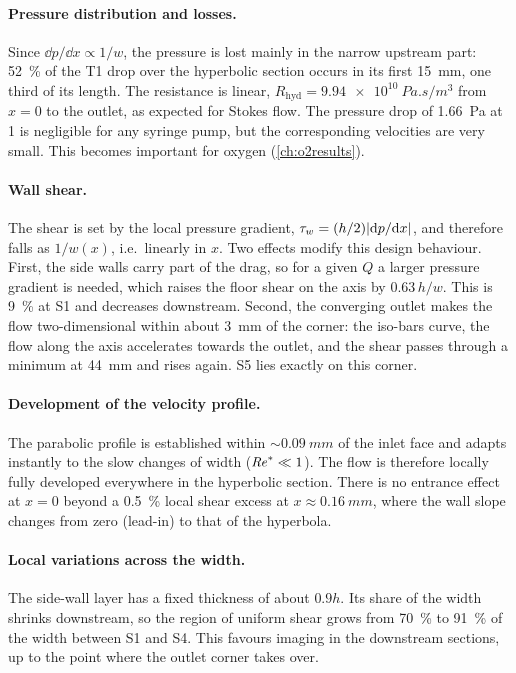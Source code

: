 \paragraph{Pressure distribution and losses.} Since $\dd p/\dd x\propto1/w$, the pressure is lost mainly in the narrow upstream part: \SI{52}{\percent} of the T1 drop over the hyperbolic section occurs in its first \SI{15}{mm}, one third of its length. The resistance is linear, $R_{\mathrm{hyd}}=\SI{9.94e10}{Pa.s/m^3}$ from $x=0$ to the outlet, as expected for Stokes flow. The pressure drop of \SI{1.66}{Pa} at \SI{1}{\uLmin} is negligible for any syringe pump, but the corresponding velocities are very small. This becomes important for oxygen (\cref{ch:o2results}).

\paragraph{Wall shear.} The shear is set by the local pressure gradient, $\tau_{w}=(h/2)|\mathrm{d} p/\mathrm{d} x|$, and therefore falls as $1/w(x)$, i.e.\ linearly in $x$. Two effects modify this design behaviour. First, the side walls carry part of the drag, so for a given $Q$ a larger pressure gradient is needed, which raises the floor shear on the axis by $0.63\,h/w$. This is \SI{9}{\percent} at S1 and decreases downstream. Second, the converging outlet makes the flow two-dimensional within about \SI{3}{mm} of the corner: the iso-bars curve, the flow along the axis accelerates towards the outlet, and the shear passes through a minimum at \SI{44}{mm} and rises again. S5 lies exactly on this corner.

\paragraph{Development of the velocity profile.} The parabolic profile is established within $\sim\SI{0.09}{mm}$ of the inlet face and adapts instantly to the slow changes of width ($\mathit{Re}^*\ll1$). The flow is therefore locally fully developed everywhere in the hyperbolic section. There is no entrance effect at $x=0$ beyond a \SI{0.5}{\percent} local shear excess at $x\approx\SI{0.16}{mm}$, where the wall slope changes from zero (lead-in) to that of the hyperbola.

\paragraph{Local variations across the width.} The side-wall layer has a fixed thickness of about $0.9h$. Its share of the width shrinks downstream, so the region of uniform shear grows from \SI{70}{\percent} to \SI{91}{\percent} of the width between S1 and S4. This favours imaging in the downstream sections, up to the point where the outlet corner takes over.

